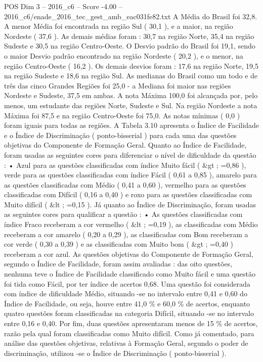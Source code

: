 \begin{textsample}{POS Dim 3 – 2016\_c6 – Score -4.00 – 2016\_c6/enade\_2016\_tec\_gest\_amb\_eac031fe82.txt}
A Média do Brasil foi 32,8.
A menor Média foi encontrada na região Sul ( 30,1 ), e a maior, na região Nordeste ( 37,6 ).
As demais médias foram : 30,7 na região Norte, 35,4 na região Sudeste e 30,5 na região Centro-Oeste.
O Desvio padrão do Brasil foi 19,1, sendo o maior Desvio padrão encontrado na região Nordeste ( 20,2 ), e o menor, na região Centro-Oeste ( 16,2 ).
Os demais desvios foram : 17,6 na região Norte, 19,5 na região Sudeste e 18,6 na região Sul.
As medianas do Brasil como um todo e de três das cinco Grandes Regiões foi 25,0 - a Mediana foi maior nas regiões Nordeste e Sudeste, 37,5 em ambas.
A nota Máxima 100,0 foi alcançada por, pelo menos, um estudante das regiões Norte, Sudeste e Sul.
Na região Nordeste a nota Máxima foi 87,5 e na região Centro-Oeste foi 75,0.
As notas mínimas ( 0,0 ) foram iguais para todas as regiões.
A Tabela 3.10 apresenta o Índice de Facilidade e o Índice de Discriminação ( ponto-bisserial ) para cada uma das questões objetivas do Componente de Formação Geral.
Quanto ao Índice de Facilidade, foram usadas as seguintes cores para diferenciar o nível de dificuldade da questão : • Azul para as questões classificadas com índice Muito fácil ( \&gt ; =0,86 ), verde para as questões classificadas com índice Fácil ( 0,61 a 0,85 ), amarelo para as questões classificadas com Médio ( 0,41 a 0,60 ), vermelho para as questões classificadas com Difícil ( 0,16 a 0,40 ) e roxo para as questões classificadas com Muito difícil ( \&lt ; =0,15 ).
Já quanto ao Índice de Discriminação, foram usadas as seguintes cores para qualificar a questão : • As questões classificadas com índice Fraco receberam a cor vermelho ( \&lt ; =0,19 ), as classificadas com Médio receberam a cor amarelo ( 0,20 a 0,29 ), as classificadas com Bom receberam a cor verde ( 0,30 a 0,39 ) e as classificadas com Muito bom ( \&gt ; =0,40 ) receberam a cor azul.
As questões objetivas do Componente de Formação Geral, segundo o Índice de Facilidade, foram assim avaliadas : das oito questões, nenhuma teve o Índice de Facilidade classificado como Muito fácil e uma questão foi tida como Fácil, por ter índice de acertos 0,68.
Uma questão foi considerada com índice de dificuldade Médio, situando -se no intervalo entre 0,41 e 0,60 do Índice de Facilidade, ou seja, houve entre 41,0 \% e 60,0 \% de acertos, enquanto quatro questões foram classificadas na categoria Difícil, situando -se no intervalo entre 0,16 e 0,40.
Por fim, duas questões apresentaram menos de 15 \% de acertos, razão pela qual foram classificadas como Muito difícil.
Como já comentado, para análise das questões objetivas, relativas à Formação Geral, segundo o poder de discriminação, utilizou -se o Índice de Discriminação ( ponto-bisserial ).

\end{textsample}
